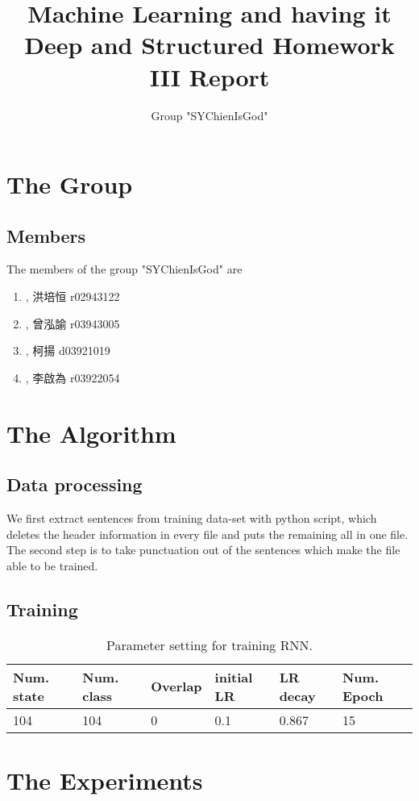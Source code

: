 \documentclass[]{article}
\title{Machine Learning and having it Deep and Structured Homework III Report}
\author{Group "SYChienIsGod"}
\begin{document}
\maketitle


\section{The Group}
\subsection{Members}
The members of the group "SYChienIsGod" are
\begin{CJK}{UTF8}{bsmi}
\begin{enumerate}
	\item , 洪培恒 r02943122
	\item , 曾泓諭 r03943005
	\item , 柯揚   d03921019
	\item , 李啟為 r03922054
\end{enumerate}
\end{CJK}
\section{The Algorithm}

\subsection{Data processing}
We first extract sentences from training data-set with python script, which deletes the header information in every file and puts the remaining all in one file. The second step is to take punctuation out of the sentences which make the file able to be trained.

\subsection{Training}

\begin{table}
\begin{center}
\begin{tabular}{ |l|l|l|l|l|l| }
\hline
Num. state & Num. class & Overlap & initial LR & LR decay & Num. Epoch\\ \hline
104 & 104 & 0 & 0.1 & 0.867 & 15\\ \hline
\end{tabular}
\caption{Parameter setting for training RNN.}
\label{tb:par_for_train}
\end{center}
\end{table}

\section{The Experiments}
\end{document}
